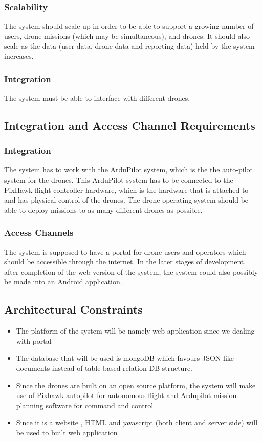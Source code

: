 \documentclass{article}
\begin{document}
	\subsubsection{Scalability}
	The system should scale up in order to be able to support a growing number of users, drone missions (which may be simultaneous), and drones. It should also scale as the data (user data, drone data and reporting data) held by the system increases.
	
	\subsubsection{Integration}
	The system must be able to interface with different drones.
	\subsection{Integration and Access Channel Requirements}%
	\subsubsection{Integration}
	The system has to work with the ArduPilot system, which is the the auto-pilot system for the drones. This ArduPilot system has to be connected to the PixHawk flight controller hardware, which is the hardware that is attached to and has physical control of the drones. The drone operating system should be able to deploy missions to as many different drones as possible.
	\subsubsection{Access Channels}
	The system is supposed to have a portal for drone users and operators which should be accessible through the internet. In the later stages of development, after completion of the web version of the system, the system could also possibly be made into an Android application.
	\subsection{Architectural Constraints }%
	\begin{itemize}
		\item	The platform of the system will  be namely web application since we dealing with portal 
		\item	The database that will be used is mongoDB which favours JSON-like documents instead of table-based relation DB structure.
		\item 	Since the drones are built on an open source platform, the system will make use of Pixhawk autopilot for autonomous flight and Ardupilot mission planning software for command and control
		\item 	Since it is a website , HTML and javascript (both client and server side) will be used to built web application
	\end{itemize}
	
\end{document}

